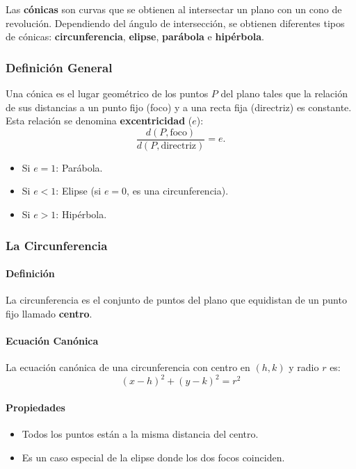 \documentclass[11pt]{book}
\theoremstyle{definicion}
\theoremstyle{teorema}
\theoremstyle{ejemplo}
\begin{document}


Las \textbf{cónicas} son curvas que se obtienen al intersectar un plano con un cono de revolución. Dependiendo del ángulo de intersección, se obtienen diferentes tipos de cónicas: \textbf{circunferencia}, \textbf{elipse}, \textbf{parábola} e \textbf{hipérbola}.

\subsubsection{Definición General}
Una cónica es el lugar geométrico de los puntos \( P \) del plano tales que la relación de sus distancias a un punto fijo (foco) y a una recta fija (directriz) es constante. Esta relación se denomina \textbf{excentricidad} (\( e \)):
\[
\frac{d(P, \text{foco})}{d(P, \text{directriz})} = e.
\]
\begin{itemize}
    \item Si \( e = 1 \): Parábola.
    \item Si \( e < 1 \): Elipse (si \( e = 0 \), es una circunferencia).
    \item Si \( e > 1 \): Hipérbola.
\end{itemize}

\subsubsection{La Circunferencia}
\paragraph{Definición}
La circunferencia es el conjunto de puntos del plano que equidistan de un punto fijo llamado \textbf{centro}.

\paragraph{Ecuación Canónica}
La ecuación canónica de una circunferencia con centro en \( (h, k) \) y radio \( r \) es:
\[
(x - h)^2 + (y - k)^2 = r^2
\]

\paragraph{Propiedades}
\begin{itemize}
    \item Todos los puntos están a la misma distancia del centro.
    \item Es un caso especial de la elipse donde los dos focos coinciden.
\end{itemize}
\end{document}

